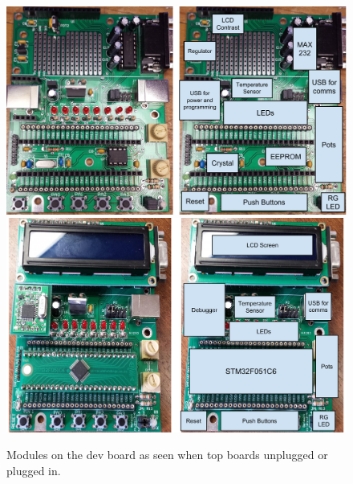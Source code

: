 \begin{figure}
  \centering
  \includegraphics[width=\textwidth]{./week1/dev_board_unplugged.pdf}\\
  \vspace{3mm}
  \includegraphics[width=\textwidth]{./week1/dev_board_plugged_in.pdf}
  \caption{Modules on the dev board as seen when top boards unplugged or plugged in.}
\end{figure}

